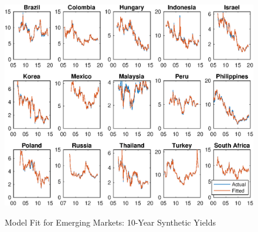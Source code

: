\documentclass{article}
\begin{document}
\begin{figure}[tbph]
	\begin{center}
		\caption{Model Fit for Emerging Markets: 10-Year Synthetic Yields}
		\label{fig:s_ylds_bsl_yQ}
		\includegraphics[trim={0cm 0cm 0cm 0cm},clip,height=1\textheight,width=1.4\textwidth]{../Figures/Estimation/s_ylds_bsl_yQ.eps} \\
	\end{center}
\end{figure}
\end{document}
